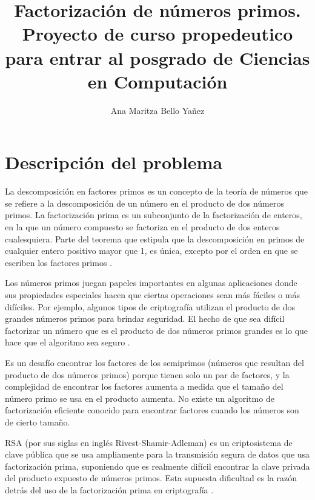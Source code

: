 \documentclass{article}
\begin{document}
\title{Factorización de números primos. \\ Proyecto de curso propedeutico para entrar al posgrado de Ciencias en Computación}
\author{Ana Maritza Bello Yañez}
\maketitle

\tableofcontents

\section{Descripción del problema}

La descomposición en factores primos es un concepto de la teoría de números que
se refiere a la descomposición de un número en el producto de dos números
primos. La factorización prima es un subconjunto de la factorización de enteros,
en la que un número compuesto se factoriza en el producto de dos enteros
cualesquiera. Parte del teorema que estipula que la descomposición en primos de
cualquier entero positivo mayor que 1, es única, excepto por el orden en que se
escriben los factores primos \cite{lewinter2015elementary}.

Los números primos juegan papeles importantes en algunas aplicaciones donde sus
propiedades especiales hacen que ciertas operaciones sean más fáciles o más
difíciles. Por ejemplo, algunos tipos de criptografía utilizan el producto de
dos grandes números primos para brindar seguridad. El hecho de que sea difícil
factorizar un número que es el producto de dos números primos grandes es lo que
hace que el algoritmo sea seguro \cite{stephens2019essential}.

Es un desafío encontrar los factores de los semiprimos (números que resultan del
producto de dos números primos) porque tienen solo un par de factores, y la
complejidad de encontrar los factores aumenta a medida que el tamaño del número
primo se usa en el producto aumenta. No existe un algoritmo de factorización
eficiente conocido para encontrar factores cuando los números son de cierto
tamaño. 

RSA (por sus siglas en inglés Rivest-Shamir-Adleman) es un criptosistema de
clave pública que se usa ampliamente para la transmisión segura de datos que usa
factorización prima, suponiendo que es realmente difícil encontrar la clave
privada del producto expuesto de números primos. Esta supuesta dificultad es la
razón detrás del uso de la factorización prima en criptografía
\cite{raj2019foundations}.
\end{document}
